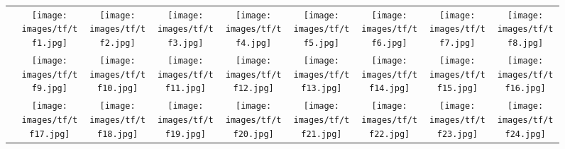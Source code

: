 \documentclass[runningheads]{llncs}
\begin{document}
\begin{figure*}[t]
\setlength\tabcolsep{2pt}\begin{tabularx}{\textwidth}{@{}c*{8}{C}@{}}
 &
   \texttt{[image: images/tf/tf1.jpg]} &
   \texttt{[image: images/tf/tf2.jpg]}
   &
    \texttt{[image: images/tf/tf3.jpg]}
   &
   \texttt{[image: images/tf/tf4.jpg]}
   &
   \texttt{[image: images/tf/tf5.jpg]}
   &
   \texttt{[image: images/tf/tf6.jpg]}
   &
   \texttt{[image: images/tf/tf7.jpg]}
   &
   \texttt{[image: images/tf/tf8.jpg]} \\
   &
   \texttt{[image: images/tf/tf9.jpg]} &
   \texttt{[image: images/tf/tf10.jpg]}
   &
    \texttt{[image: images/tf/tf11.jpg]}
   &
   \texttt{[image: images/tf/tf12.jpg]}
   &
   \texttt{[image: images/tf/tf13.jpg]}
   &
   \texttt{[image: images/tf/tf14.jpg]}
   &
   \texttt{[image: images/tf/tf15.jpg]}
   &
   \texttt{[image: images/tf/tf16.jpg]}
   \\
   &
   \texttt{[image: images/tf/tf17.jpg]} &
   \texttt{[image: images/tf/tf18.jpg]}
   &
    \texttt{[image: images/tf/tf19.jpg]}
   &
   \texttt{[image: images/tf/tf20.jpg]}
   &
   \texttt{[image: images/tf/tf21.jpg]}
   &
   \texttt{[image: images/tf/tf22.jpg]}
   &
   \texttt{[image: images/tf/tf23.jpg]}
   &
   \texttt{[image: images/tf/tf24.jpg]} \\

\end{tabularx}
\end{figure*}
\end{document}
